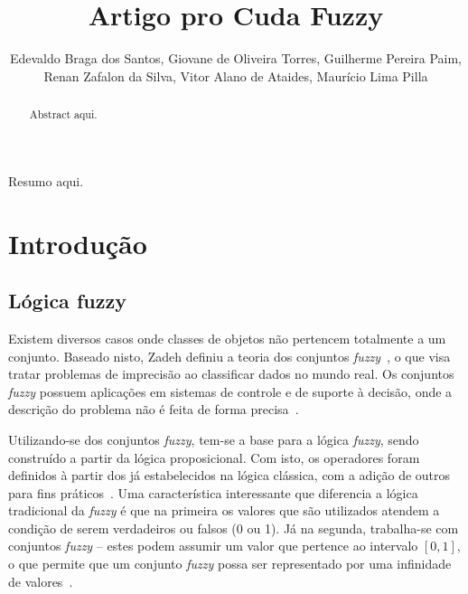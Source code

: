 \documentclass[12pt]{article}
\title{Artigo pro Cuda Fuzzy}
\author{Edevaldo Braga dos Santos\inst{1}, Giovane de Oliveira Torres\inst{1}, Guilherme Pereira Paim\inst{1},\\ Renan Zafalon da Silva\inst{1}, Vitor Alano de Ataides\inst{1}, Maurício Lima Pilla\inst{1}}
\begin{document}
\maketitle

\begin{abstract}

Abstract aqui.

\end{abstract}

\begin{resumo}

Resumo aqui.

\end{resumo}

\section{Introdução}


\subsection{Lógica fuzzy}

	Existem diversos casos onde classes de objetos não pertencem totalmente a um conjunto. Baseado nisto, Zadeh definiu a teoria dos conjuntos \textit{fuzzy}~\cite{zadeh:65}, o que visa tratar problemas de imprecisão ao classificar dados no mundo real. Os conjuntos \textit{fuzzy} possuem aplicações em sistemas de controle e de suporte à decisão, onde a descrição do problema não é feita de forma precisa~\cite{weber:03}.
	
	Utilizando-se dos conjuntos \textit{fuzzy}, tem-se a base para a lógica \textit{fuzzy}, sendo construído a partir da lógica proposicional. Com isto, os operadores foram definidos à partir dos já estabelecidos na lógica clássica, com a adição de outros para fins práticos~\cite{tanscheit:04}. Uma característica interessante que diferencia a lógica tradicional da \textit{fuzzy} é que na primeira os valores que são utilizados atendem a condição de serem verdadeiros ou falsos (0 ou 1). Já na segunda, trabalha-se com conjuntos \textit{fuzzy} -- estes podem assumir um valor que pertence ao intervalo $[0, 1]$, o que permite que um conjunto \textit{fuzzy} possa ser representado por uma infinidade de valores~\cite{klir:95}.	
	


\end{document}
